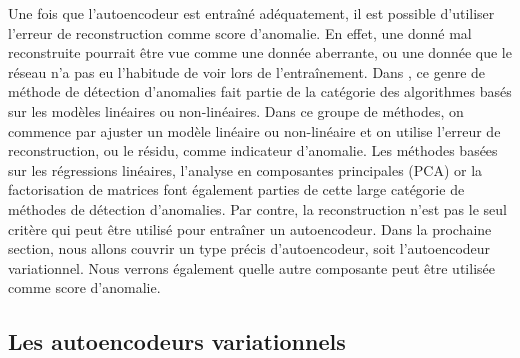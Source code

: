 Une fois que l'autoencodeur est entraîné adéquatement, il est possible d'utiliser l'erreur de reconstruction comme score d'anomalie. En effet, une donné mal reconstruite pourrait être vue comme une donnée aberrante, ou une donnée que le réseau n'a pas eu l'habitude de voir lors de l'entraînement. Dans  \cite{10.5555/3086742}, ce genre de méthode de détection d'anomalies fait partie de la catégorie des algorithmes basés sur les modèles linéaires ou non-linéaires. Dans ce groupe de méthodes, on commence par ajuster un modèle linéaire ou non-linéaire et on utilise l'erreur de reconstruction, ou le résidu, comme indicateur d'anomalie. Les méthodes basées sur les régressions linéaires, l'analyse en composantes principales (PCA) or la factorisation de matrices font également parties de cette large catégorie de méthodes de détection d'anomalies. Par contre, la reconstruction n'est pas le seul critère qui peut être utilisé pour entraîner un autoencodeur. Dans la prochaine section, nous allons couvrir un type précis d'autoencodeur, soit l'autoencodeur variationnel. Nous verrons également quelle autre composante peut être utilisée comme score d'anomalie.

\subsection{Les autoencodeurs variationnels} \label{background-vae}


